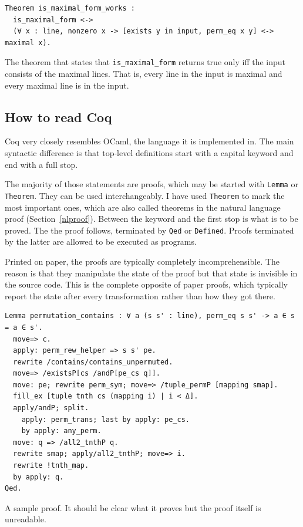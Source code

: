 \documentclass[english, 12pt, a4paper, sci, a-1b, online]{aaltothesis}
\newcommand\icoq[1]{\texttt{#1}}
\begin{document}
\begin{listing}[h]
\begin{verbatim}
Theorem is_maximal_form_works :
  is_maximal_form <->
  (∀ x : line, nonzero x -> [exists y in input, perm_eq x y] <-> maximal x).
\end{verbatim}
\caption{The theorem that states that \icoq{is_maximal_form} returns true only iff the input consists of the maximal lines. That is, every line in the input is maximal and every maximal line is in the input.}
\end{listing}

\subsection{How to read Coq}

Coq very closely resembles OCaml, the language it is implemented in. The main syntactic difference is that top-level definitions start with a capital keyword and end with a full stop.

The majority of those statements are proofs, which may be started with \icoq{Lemma} or \icoq{Theorem}. They can be used interchangeably. I have used \icoq{Theorem} to mark the most important ones, which are also called theorems in the natural language proof (Section~\ref{nlproof}). Between the keyword and the first stop is what is to be proved. The the proof follows, terminated by \icoq{Qed} or \icoq{Defined}. Proofs terminated by the latter are allowed to be executed as programs.

Printed on paper, the proofs are typically completely incomprehensible. The reason is that they manipulate the state of the proof but that state is invisible in the source code. This is the complete opposite of paper proofs, which typically report the state after every transformation rather than how they got there.

\begin{listing}[h]
\begin{verbatim}
Lemma permutation_contains : ∀ a (s s' : line), perm_eq s s' -> a ∈ s = a ∈ s'.
  move=> c.
  apply: perm_rew_helper => s s' pe.
  rewrite /contains/contains_unpermuted.
  move=> /existsP[cs /andP[pe_cs q]].
  move: pe; rewrite perm_sym; move=> /tuple_permP [mapping smap].
  fill_ex [tuple tnth cs (mapping i) | i < Δ].
  apply/andP; split.
    apply: perm_trans; last by apply: pe_cs.
    by apply: any_perm.
  move: q => /all2_tnthP q.
  rewrite smap; apply/all2_tnthP; move=> i.
  rewrite !tnth_map.
  by apply: q.
Qed.
\end{verbatim}
\caption{A sample proof. It should be clear what it proves but the proof itself is unreadable.}
\end{listing}
\end{document}
